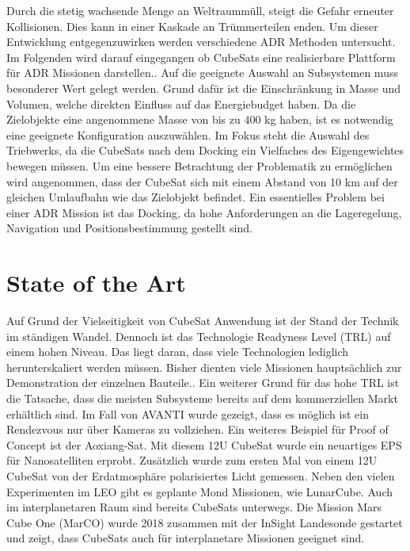 \begin{flushleft}
Durch die stetig wachsende Menge an Weltraummüll, steigt die Gefahr erneuter Kollisionen. Dies kann in einer Kaskade an Trümmerteilen enden. Um dieser Entwicklung entgegenzuwirken werden verschiedene ADR Methoden untersucht.
Im Folgenden wird darauf eingegangen ob CubeSats eine realisierbare Plattform für ADR Missionen darstellen..
Auf die geeignete Auswahl an Subsystemen muss besonderer Wert gelegt werden. Grund dafür ist die Einschränkung in Masse und Volumen, welche direkten Einfluss auf das Energiebudget haben. 
Da die Zielobjekte eine angenommene Masse von bis zu 400 kg haben, ist es notwendig eine geeignete Konfiguration auszuwählen. Im Fokus steht die Auswahl des Triebwerks, da die CubeSats nach dem Docking ein Vielfaches des Eigengewichtes bewegen müssen. 
Um eine bessere Betrachtung der Problematik zu ermöglichen wird angenommen, dass der CubeSat sich mit einem Abstand von 10 km auf der gleichen Umlaufbahn wie das Zielobjekt befindet. Ein essentielles Problem bei einer ADR Mission ist das Docking, da hohe Anforderungen an die Lageregelung, Navigation und Positionsbestimmung gestellt sind.
\end{flushleft}

		\section{State of the Art}
		
\begin{flushleft}
Auf Grund der Vielseitigkeit von CubeSat Anwendung ist der Stand der Technik im ständigen Wandel. Dennoch ist das Technologie Readyness Level (TRL) auf einem hohen Niveau. Das liegt daran, dass viele Technologien lediglich herunterskaliert werden müssen. Bisher dienten viele Missionen hauptsächlich zur Demonstration der einzelnen Bauteile.. Ein weiterer Grund für das hohe TRL ist die Tatsache, dass die meisten Subsysteme bereits auf dem kommerziellen Markt erhältlich sind.
Im Fall von AVANTI wurde gezeigt, dass es möglich ist ein Rendezvous nur über Kameras zu vollziehen.
Ein weiteres Beispiel für Proof of Concept ist der Aoxiang-Sat. Mit diesem 12U CubeSat wurde ein neuartiges EPS für Nanosatelliten erprobt. Zusätzlich wurde zum ersten Mal von einem 12U CubeSat von der Erdatmosphäre polarisiertes Licht gemessen.
Neben den vielen Experimenten im LEO gibt es geplante Mond Missionen, wie LunarCube. Auch im interplanetaren Raum sind bereits CubeSats unterwegs. Die Mission Mars Cube One (MarCO) wurde 2018 zusammen mit der InSight Landesonde gestartet und zeigt, dass CubeSats auch für interplanetare Missionen geeignet sind.
\end{flushleft}

